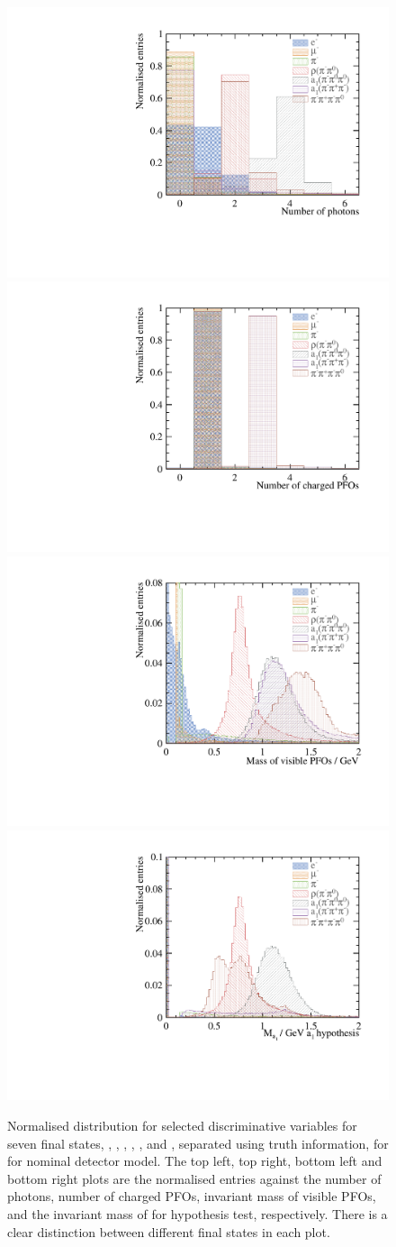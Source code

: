 \begin{figure}[htbp]
\centering

\includegraphics[width=.45\textwidth]{tau/var/nPhoton_100GeV_improved}
\qquad
\includegraphics[width=.45\textwidth]{tau/var/nCharge_100GeV_improved}
\qquad
\includegraphics[width=.45\textwidth]{tau/var/mVis_100GeV_improved_zoom}
\qquad
\includegraphics[width=.45\textwidth]{tau/var/mA1A1Fit_100GeV_improved_zoom}
\qquad

\caption[]{
Normalised distribution for selected discriminative variables for seven final states, \decayElectron, \decayMuon, \decayPion, \decayRho, \decayAiPhoton, \decayAiPion and \decayThreePionPhoton, separated using truth information,  for  for nominal \CLICILD detector model. The top left, top right, bottom left and bottom right plots are the normalised entries against the number of photons, number of charged PFOs, invariant mass of visible PFOs, and the invariant mass of \decayAiPhotonShort for hypothesis test, respectively. There is a clear distinction between different final states in each plot.
}
\label{fig:tauVar}
\end{figure}

